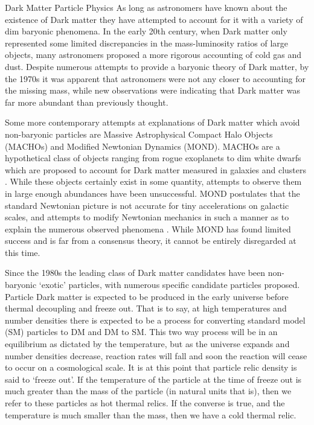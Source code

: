 \documentclass[a4paper,11pt]{article}
\begin{document}
\begin{section}{Dark Matter Particle Physics}
    As long as astronomers have known about the existence of Dark matter they have attempted to account for it with a variety of dim baryonic phenomena.
    In the early 20th century, when Dark matter only represented some limited discrepancies in the mass-luminosity ratios of large objects, many astronomers proposed a more rigorous accounting of cold gas and dust. 
    Despite numerous attempts to provide a baryonic theory of Dark matter, by the 1970s it was apparent that astronomers were not any closer to accounting for the missing mass, while new observations were indicating that Dark matter was far more abundant than previously thought. 

    Some more contemporary attempts at explanations of Dark matter which avoid non-baryonic particles are Massive Astrophysical Compact Halo Objects (MACHOs) and Modified Newtonian Dynamics (MOND).
    MACHOs are a hypothetical class of objects ranging from rogue exoplanets to dim white dwarfs which are proposed to account for Dark matter measured in galaxies and clusters \cite{Bertone:2018}.
    While these objects certainly exist in some quantity, attempts to observe them in large enough abundances have been unsuccessful.
    MOND postulates that the standard Newtonian picture is not accurate for tiny accelerations on galactic scales, and attempts to modify Newtonian mechanics in such a manner as to explain the numerous observed phenomena \cite{Bertone:2018}.
    While MOND has found limited success and is far from a consensus theory, it cannot be entirely disregarded at this time.

    Since the 1980s the leading class of Dark matter candidates have been non-baryonic `exotic' particles, with numerous specific candidate particles proposed. 
    Particle Dark matter is expected to be produced in the early universe before thermal decoupling and freeze out.
    That is to say, at high temperatures and number densities there is expected to be a process for converting standard model (SM) particles to DM and DM to SM.
    This two way process will be in an equilibrium as dictated by the temperature, but as the universe expands and number densities decrease, reaction rates will fall and soon the reaction will cease to occur on a cosmological scale.
    It is at this point that particle relic density is said to `freeze out'.
    If the temperature of the particle at the time of freeze out is much greater than the mass of the particle (in natural units that is), then we refer to these particles as hot thermal relics.
    If the converse is true, and the temperature is much smaller than the mass, then we have a cold thermal relic.


\end{section}
\end{document}
